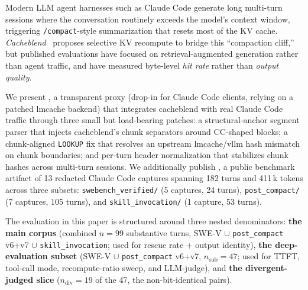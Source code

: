 
Modern LLM agent harnesses such as Claude Code generate long multi-turn
sessions where the conversation routinely exceeds the model's context
window, triggering \texttt{/compact}-style summarization that resets
most of the KV cache. \emph{Cacheblend}~\cite{lmcache-cacheblend} proposes
selective KV recompute to bridge this ``compaction cliff,'' but
published evaluations have focused on retrieval-augmented generation
rather than agent traffic, and have measured byte-level \emph{hit
rate} rather than \emph{output quality}.

We present \sys, a transparent proxy (drop-in for Claude Code clients,
relying on a patched lmcache backend) that integrates cacheblend with
real Claude Code traffic through three small but load-bearing patches: a
structural-anchor segment parser that injects cacheblend's chunk
separators around CC-shaped blocks; a chunk-aligned \texttt{LOOKUP} fix
that resolves an upstream lmcache/vllm hash mismatch on chunk
boundaries; and per-turn header normalization that stabilizes chunk
hashes across multi-turn sessions. We additionally publish \dataset, a
public benchmark artifact of 13 redacted Claude Code captures spanning
182 turns and 411\,k tokens across three subsets:
\texttt{swebench\_verified/} (5 captures, 24 turns),
\texttt{post\_compact/} (7 captures, 105 turns), and
\texttt{skill\_invocation/} (1 capture, 53 turns).

The evaluation in this paper is structured around three nested
denominators:
\textbf{the main corpus} (combined $n{=}99$ substantive turns,
SWE-V $\cup$ \texttt{post\_compact} v6+v7 $\cup$
\texttt{skill\_invocation};
used for rescue rate + output identity),
\textbf{the deep-evaluation subset}
(SWE-V $\cup$ \texttt{post\_compact} v6+v7, $n_{\text{sub}}{=}47$;
used for TTFT, tool-call mode, recompute-ratio sweep, and LLM-judge),
and \textbf{the divergent-judged slice}
($n_{\text{div}}{=}19$ of the 47, the non-bit-identical pairs).

